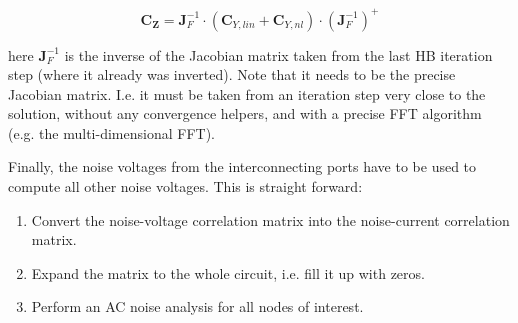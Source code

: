 \begin{equation}
\boldsymbol{C_Z} = \boldsymbol{J}_F^{-1} \cdot (\boldsymbol{C}_{Y,lin} + \boldsymbol{C}_{Y,nl})
       \cdot (\boldsymbol{J}_F^{-1})^+
\end{equation}

here $\boldsymbol{J}_F^{-1}$ is the inverse of the Jacobian matrix taken
from the last HB iteration step (where it already was inverted). Note
that it needs to be the precise Jacobian matrix. I.e. it must be taken
from an iteration step very close to the solution, without any convergence
helpers, and with a precise FFT algorithm (e.g. the multi-dimensional FFT).

\addvspace{12pt}

Finally, the noise voltages from the interconnecting ports have to be used
to compute all other noise voltages. This is straight forward:

\begin{enumerate}
\item Convert the noise-voltage correlation matrix into the noise-current
   correlation matrix.
\item Expand the matrix to the whole circuit, i.e. fill it up with zeros.
\item Perform an AC noise analysis for all nodes of interest.
\end{enumerate}

